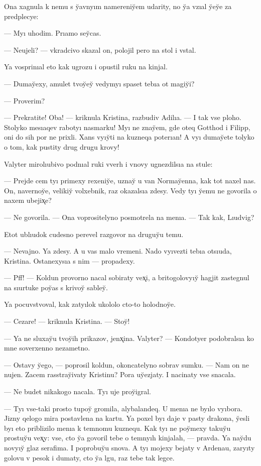 \documentclass[10pt]{book}
\begin{document}
Ona xagnula k nemu s y̆avnyım namereniy̆em udarity, no y̆a vzıal y̆ey̆e za predplecye:

— Myı uhodim. Prıamo sey̆cas.

— Neujeli? — vkradcivo skazal on, polojil pero na stol i vstal.

Ya vosprinıal eto kak ugrozu i opustil ruku na kinjal.

— Dumay̆exy, amulet tvoy̆ey̆ vedymyı spaset tebıa ot magiy̆i?

— Proverim?

— Prekratite! Oba! — kriknula Kristina, razbudiv Adilıa. — I tak vse ploho. Stolyko mesıaqev rabotyı nasmarku! Myı ne znay̆em, gde oteq Gotthod i Filipp, oni do sih por ne prixli. Xans vyıy̆ti na kuzneqa poterıan! A vyı dumay̆ete tolyko o tom, kak pustity drug drugu krovy!

Valyter mirolıubivo podnıal ruki vverh i vnovy ugnezdilsıa na stule:

— Prejde cem tyı primexy rexeniy̆e, uznay̆ u van Normay̆enna, kak tot naxel nas. On, navernoy̆e, velikiy̆ volxebnik, raz okazalsıa zdesy. Vedy tyı y̆emu ne govorila o naxem ubejix̨e?

— Ne govorila. — Ona voprositelyno posmotrela na menıa. — Tak kak, Lıudvig?

Etot ublıudok cudesno perevel razgovor na druguy̆u temu.

— Nevajno. Ya zdesy. A u vas malo vremeni. Nado vyıvezti tebıa otsıuda, Kristina. Ostanexysıa s nim — propadexy.

— Pff! — Koldun provorno nacal sobiraty vex̨i, a britogolovyıy̆ hagjit zastegnul na sıurtuke poy̆as s krivoy̆ sabley̆.

Ya pocuvstvoval, kak zatyılok ukololo cto-to holodnoy̆e.

— Cezare! — kriknula Kristina. — Stoy̆!

— Ya ne sluxay̆u tvoy̆ih prikazov, jenx̨ina. Valyter? — Kondotyer podobralsıa ko mne soverxenno nezametno.

— Ostavy y̆ego, — poprosil koldun, okoncatelyno sobrav sumku. — Nam on ne nujen. Zacem rasstray̆ivaty Kristinu? Pora uy̆ezjaty. I nacinaty vse snacala.

— Ne budet nikakogo nacala. Tyı uje proy̆igral.

— Tyı vse-taki prosto tupoy̆ gromila, alybalandeq. U menıa ne byılo vyıbora. Jizny qelogo mira postavlena na kartu. Ya poxel byı daje v pasty drakona, y̆esli byı eto priblizilo menıa k temnomu kuznequ. Kak tyı ne poy̆mexy takuy̆u prostuy̆u vex̨y: vse, cto y̆a govoril tebe o temnyıh kinjalah, — pravda. Ya nay̆du novyıy̆ glaz serafima. I poprobuy̆u snova. A tyı mojexy bejaty v Ardenau, zaryıty golovu v pesok i dumaty, cto y̆a lgu, raz tebe tak legce.
\end{document}
